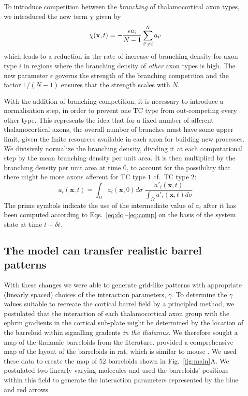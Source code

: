 \documentclass[9pt,twocolumn,twoside,lineno]{pnas-new}
\begin{document}
To introduce competition between the \emph{branching} of thalamocortical axon
types, we introduced the new term $\chi$ given by
%
\begin{equation} \label{eq:comp}
\chi(\mathbf{x}, t) = - \frac{\epsilon  a_i}{N-1} \sum_{i' \ne i}^{N} a_{i'}
\end{equation}
%
which leads to a reduction in the rate of increase
of branching density for axon type $i$ in regions where the branching density
of \emph{other} axon types is high. The new parameter $\epsilon$ governs the
strength of the branching competition and the factor $1/(N-1)$ ensures that the
strength scales with $N$.

With the addition of branching competition, it is necessary to introduce a
normalisation step, in order to prevent one TC type from out-competing every
other type. This represents the idea that for a fixed number of afferent
thalamocortical axons, the overall number of branches must have some upper
limit, given the finite resources available in each axon for building new
processes. We divisively normalize the branching density, dividing it at each
computational step by the mean branching density per unit area. It is then
multiplied by the branching density per unit area at time 0, to account for
the possibility that there might be more axons afferent for TC type $1$ cf.~TC
type $2$:
%
\begin{equation} \label{eq:norm}
  a_i(\mathbf{x}, t) = \int_\Omega  a_i(\mathbf{x}, 0) d\sigma \; \frac {a'_i(\mathbf{x}, t)} {\int_\Omega
  a'_i(\mathbf{x}, t) d\sigma}
\end{equation}
%
The prime symbols indicate the use of the intermediate value of $a_i$ after it
has been computed according to Eqs.~\ref{eq:dc}--\ref{eq:comp} on the
basis of the system state at time $t-{\delta}t$.

\subsection*{The model can transfer realistic barrel patterns}

With these changes we were able to generate grid-like patterns with
appropriate (linearly spaced) choices of the interaction parameters,
$\gamma$. To determine the $\gamma$ values suitable to recreate the cortical
barrel field by a principled method, we postulated that the interaction of
each thalamocortical axon group with the ephrin gradients in the cortical
sub-plate might be determined by the location of the barreloid within
signalling gradents \emph{in the thalamus}. We therefore sought a map of the
thalamic barreloids from the literature. \cite{haidarliu_size_2001} provided a
comprehensive map of the layout of the barreloids in rat, which is similar to
mouse \cite{van_der_loos_barreloids_1976}. We used these data to create the
map of 52 barreloids shown in Fig.~\ref{fig:main}A. We postulated two linearly
varying molecules and used the barreloids' positions within this field to
generate the interaction parameters represented by the blue and red arrows.
\end{document}
